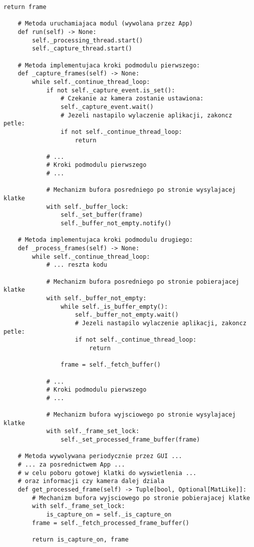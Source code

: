 \begin{lstlisting}[caption={Kod modułu silnika przetwarzania wideo z zawartymi mechanizami synchronizacji}, label={lst:engine-1}]
        return frame

    # Metoda uruchamiajaca modul (wywolana przez App)
    def run(self) -> None:
        self._processing_thread.start()
        self._capture_thread.start()

    # Metoda implementujaca kroki podmodulu pierwszego:
    def _capture_frames(self) -> None:
        while self._continue_thread_loop:
            if not self._capture_event.is_set():
                # Czekanie az kamera zostanie ustawiona:
                self._capture_event.wait()
                # Jezeli nastapilo wylaczenie aplikacji, zakoncz petle: 
                if not self._continue_thread_loop:
                    return

            # ... 
            # Kroki podmodulu pierwszego
            # ...
            
            # Mechanizm bufora posredniego po stronie wysylajacej klatke
            with self._buffer_lock:
                self._set_buffer(frame)
                self._buffer_not_empty.notify()

    # Metoda implementujaca kroki podmodulu drugiego:
    def _process_frames(self) -> None:
        while self._continue_thread_loop:
            # ... reszta kodu

            # Mechanizm bufora posredniego po stronie pobierajacej klatke
            with self._buffer_not_empty:
                while self._is_buffer_empty():
                    self._buffer_not_empty.wait()
                    # Jezeli nastapilo wylaczenie aplikacji, zakoncz petle:
                    if not self._continue_thread_loop:  
                        return

                frame = self._fetch_buffer() 

            # ... 
            # Kroki podmodulu pierwszego
            # ...

            # Mechanizm bufora wyjsciowego po stronie wysylajacej klatke
            with self._frame_set_lock:
                self._set_processed_frame_buffer(frame)

    # Metoda wywolywana periodycznie przez GUI ... 
    # ... za posrednictwem App ... 
    # w celu poboru gotowej klatki do wyswietlenia ... 
    # oraz informacji czy kamera dalej dziala
    def get_processed_frame(self) -> Tuple[bool, Optional[MatLike]]:
        # Mechanizm bufora wyjsciowego po stronie pobierajacej klatke
        with self._frame_set_lock:
            is_capture_on = self._is_capture_on
        frame = self._fetch_processed_frame_buffer()
        
        return is_capture_on, frame
\end{lstlisting}